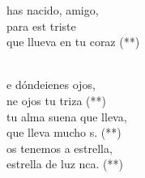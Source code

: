 \documentclass[12pt]{article}
\begin{document}
\begin{multicols*}{2}
\begin{cancion}%
	\begin{chorus}%
	has nacido, amigo,\\
	para est triste\\
	que llueva en tu coraz (**)\\
	\end{chorus}%
	\jump\\
	e dóndeienes ojos,\\
	ne ojos tu triza (**)\\
	tu alma suena  que lleva,\\
	que lleva mucho s. (**)\\
	os tenemos a estrella,\\
	 estrella de luz nca. (**)\\
\end{cancion}%


\end{multicols*}
\end{document}
